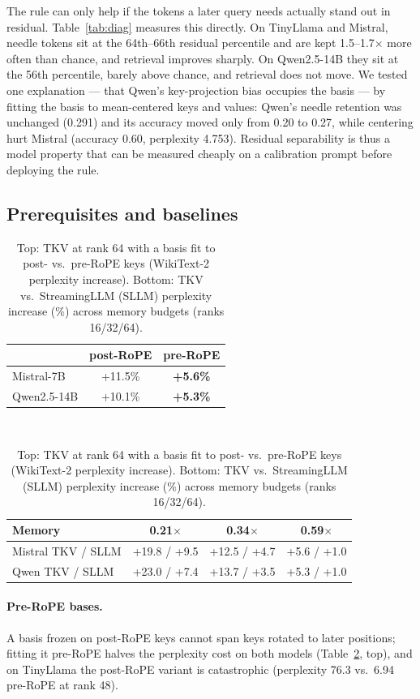 \documentclass{article}
\begin{document}
The rule can only help if the tokens a later query needs actually stand out in
residual. Table~\ref{tab:diag} measures this directly. On TinyLlama and
Mistral, needle tokens sit at the 64th--66th residual percentile and are kept
1.5--1.7$\times$ more often than chance, and retrieval improves sharply. On
Qwen2.5-14B they sit at the 56th percentile, barely above chance, and
retrieval does not move. We tested one explanation --- that Qwen's key-projection
bias occupies the basis --- by fitting the basis to mean-centered keys and
values: Qwen's needle retention was unchanged (0.291) and its accuracy moved
only from 0.20 to 0.27, while centering hurt Mistral (accuracy 0.60, perplexity
4.753). Residual separability is thus a model property that can be measured
cheaply on a calibration prompt before deploying the rule.

\subsection{Prerequisites and baselines}
\label{sec:baselines}

\begin{table}[t]
\centering
\caption{Top: TKV at rank 64 with a basis fit to post- vs.\ pre-RoPE keys
(WikiText-2 perplexity increase). Bottom: TKV vs.\ StreamingLLM (SLLM)
perplexity increase (\%) across memory budgets (ranks 16/32/64).}
\label{tab:prereq}
\small
\begin{tabular}{lcc}
\toprule
& post-RoPE & pre-RoPE \\
\midrule
Mistral-7B  & +11.5\% & \textbf{+5.6\%} \\
Qwen2.5-14B & +10.1\% & \textbf{+5.3\%} \\
\bottomrule
\end{tabular}\\[0.8em]
\begin{tabular}{lccc}
\toprule
Memory & 0.21$\times$ & 0.34$\times$ & 0.59$\times$ \\
\midrule
Mistral TKV / SLLM & +19.8 / +9.5 & +12.5 / +4.7 & +5.6 / +1.0 \\
Qwen TKV / SLLM & +23.0 / +7.4 & +13.7 / +3.5 & +5.3 / +1.0 \\
\bottomrule
\end{tabular}
\end{table}

\paragraph{Pre-RoPE bases.} A basis frozen on post-RoPE keys cannot span keys
rotated to later positions; fitting it pre-RoPE halves the perplexity cost on
both models (Table~\ref{tab:prereq}, top), and on TinyLlama the post-RoPE
variant is catastrophic (perplexity 76.3 vs.\ 6.94 pre-RoPE at rank 48).
\end{document}
